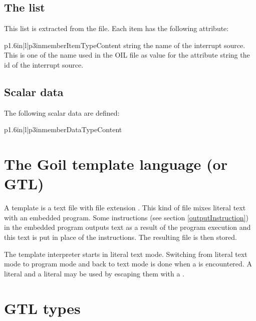 \subsection{The  list}

This list is extracted from the  file. Each item has the following attribute:

\begin{longtableiii}{p{1.6in}|l|p{3in}}{member}{Item}{Type}{Content}
  {string}
  {the name of the interrupt source. This is one of the name used in the OIL file as value for the  attribute}
  {string}
  {the id of the interrupt source.}
\end{longtableiii}



\subsection{Scalar data}

The following scalar data are defined:

\begin{longtableiii}{p{1.6in}|l|p{3in}}{member}{Data}{Type}{Content}

\end{longtableiii}

\section{The Goil template language (or GTL)}

A template is a text file with file extension . This kind of file mixes literal text with an embedded program. Some instructions (see section \ref{outputInstruction}) in the embedded program outputs text as a result of the program execution and this text is put in place of the instructions. The resulting file is then stored.

The template interpreter starts in literal text mode. Switching from literal text mode to program mode and back to text mode is done when a \character{\%} is encountered. A literal \character{\%} and a literal \character{\textbackslash} may be used by escaping them with a \character{\textbackslash}.

\section{GTL types}

